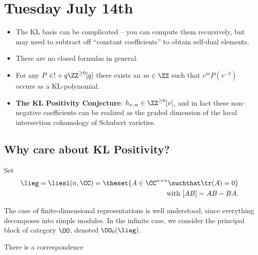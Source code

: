 \hypertarget{tuesday-july-14th}{%
\section{Tuesday July 14th}\label{tuesday-july-14th}}

\begin{remark}

\hfill

\begin{itemize}
\tightlist
\item
  The KL basis can be complicated -- you can compute them recursively,
  but may need to subtract off ``constant coefficients'' to obtain
  self-dual elements.
\item
  There are no closed formulas in general.
\item
  For any \(P\in ! + q \ZZ^{\geq 0}[q]\) there exists an \(m\in \ZZ\)
  such that \(v^m P(v^{-2})\) occurs as a KL-polynomial.
\item
  \textbf{The KL Positivity Conjecture}:
  \(h_{x, w} \in \ZZ^{\geq 0} [v]\), and in fact these non-negative
  coefficients can be realized as the graded dimension of the local
  intersection cohomology of Schubert varieties.
\end{itemize}

\end{remark}

\hypertarget{why-care-about-kl-positivity}{%
\subsection{Why care about KL
Positivity?}\label{why-care-about-kl-positivity}}

Set
\begin{align*}
\lieg = \liesl(n, \CC) = \theset{A\in \CC^{n\times n} \suchthat \tr(A) = 0}\\
\text{with } 
[AB] = AB - BA
.\end{align*}

The case of finite-dimensional representations is well understood, since
everything decomposes into simple modules. In the infinite case, we
consider the principal block of category \(\OO\), denoted
\(\OO_0(\lieg)\).

There is a correspondence

\begin{center}\end{center}

